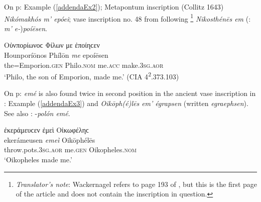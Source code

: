 On p\pageref{forAddenda3}: Example (\ref{addendaEx2}); Metapontum inscription (Collitz 1643) \textit{Nikómakhós \emph{m'} epóei}; vase inscription no. 48 from \citet[65]{Klein1887} following \citet[195]{Six1888}\footnote{\emph{Translator's note}: Wackernagel refers to page 193 of \citet{Six1888}, but this is the first page of the article and does not contain the inscription in question.} \textit{Nikosthénēs em} (\citeauthor{Six1888}: \textit{\emph{m'} e-})\textit{poíēsen}.

\begin{exe}
\ex Οὑνπορίωνοϲ Φίλων με ἐποίηϲεν\\
\gll Hounporíōnos Phílōn \emph{me} epoíēsen\\
the=Emporion.\textsc{gen} Philo.\textsc{nom} me.\textsc{acc} make.\textsc{3sg.aor}\\
\trans `Philo, the son of Emporion, made me.' (CIA 4\textsuperscript{2}.373.103)
\label{addendaEx2}
\end{exe}

On p\pageref{forAddenda2}: \textit{emé} is also found twice in second position in the ancient vase inscription in \citet[168]{Pottier1888}: Example (\ref{addendaEx3}) and \textit{Oikōph(é)lēs \emph{em'} égrapsen} (written \textit{egraephsen}). See also \citet[180]{Pottier1888}: -\textit{polón emé}.

\begin{exe}
\ex ἐκεράμευϲεν ἐμεὶ Οἰκωφέληϲ\\
\gll ekerámeusen \emph{emeì} Oikōphélēs\\
throw.pots.\textsc{3sg.aor} me.\textsc{gen} Oikopheles.\textsc{nom}\\
\trans `Oikopheles made me.' \citep[168]{Pottier1888}
\label{addendaEx3}
\end{exe}

